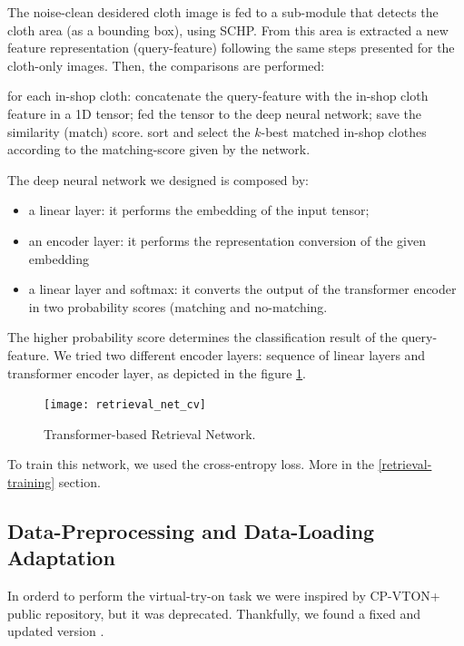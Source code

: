 The noise-clean desidered cloth image is fed to a sub-module that detects the cloth area (as a bounding box), using SCHP. From this area is extracted a new feature representation (query-feature) following the same steps presented for the cloth-only images. Then, the comparisons are performed:
\begin{outline}
\1 for each in-shop cloth:
	\2 concatenate the query-feature with the in-shop cloth feature in a 1D tensor;
	\2 fed the tensor to the deep neural network;
	\2 save the similarity (match) score.
\1 sort and select the $k$-best matched in-shop clothes according to the matching-score given by the network. 
\end{outline}

The deep neural network we designed is composed by:
\begin{itemize}
	\item{a linear layer: it performs the embedding of the input tensor;}
	\item{an encoder layer: it performs the representation conversion of the given embedding}
	\item{a linear layer and softmax: it converts the output of the transformer encoder in two probability scores (matching and no-matching.}
\end{itemize}
The higher probability score determines the classification result of the query-feature. We tried two different encoder layers: sequence of linear layers and transformer encoder layer, as depicted in the figure \ref{fig:cloth-retrieval-net}.

\begin{figure}[h]
\centering
\texttt{[image: retrieval\_net\_cv]}
\caption{Transformer-based Retrieval Network.}
\label{fig:cloth-retrieval-net}
\end{figure}



To train this network, we used the cross-entropy loss. More in the \ref{retrieval-training} section.



\subsection{Data-Preprocessing and Data-Loading Adaptation}
In orderd to perform the virtual-try-on task we were inspired by CP-VTON+ \cite{CP-VTON+} public repository, but it was deprecated. Thankfully, we found a fixed and updated version \cite{ARajgor}.


